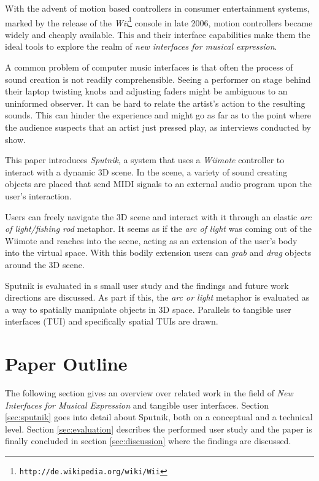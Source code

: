 \documentclass[10pt,a4paper]{scrartcl}
\begin{document}
With the advent of motion based controllers in consumer entertainment systems, marked by the release of the \emph{Wii}\footnote{\texttt{http://de.wikipedia.org/wiki/Wii}} console in late 2006, motion controllers became widely and cheaply available. This and their interface capabilities make them the ideal tools to explore the realm of \emph{new interfaces for musical expression}.


A common problem of computer music interfaces is that often the process of sound creation is not readily comprehensible. Seeing a performer on stage behind their laptop twisting knobs and adjusting faders might be ambiguous to an uninformed observer. It can be hard to relate the artist's action to the resulting sounds. This can hinder the experience and might go as far as to the point where the audience suspects that an artist just pressed play, as interviews conducted by \cite{Pedersen2009} show.

This paper introduces \emph{Sputnik}, a system that uses a \emph{Wiimote} controller to interact with a dynamic 3D scene. In the scene, a variety of sound creating objects are placed that send MIDI signals to an external audio program upon the user's interaction. 

Users can freely navigate the 3D scene and interact with it through an elastic \emph{arc of light/fishing rod} metaphor. It seems as if the \emph{arc of light} was coming out of the Wiimote and reaches into the scene, acting as an extension of the user's body into the virtual space. With this bodily extension users can \emph{grab} and \emph{drag} objects around the 3D scene.



Sputnik is evaluated in s small user study and the findings and future work directions are discussed. As part if this, the \emph{arc or light} metaphor is evaluated as a way to spatially manipulate objects in 3D space. Parallels to tangible user interfaces (TUI)\citep{Ishii1997} and specifically spatial TUIs\citep{Sharlin2004} are drawn. 


\section{Paper Outline}
The following section gives an overview over related work in the field of \emph{New Interfaces for Musical Expression} and tangible user interfaces. Section \ref{sec:sputnik} goes into detail about Sputnik, both on a conceptual and a technical level. Section \ref{sec:evaluation} describes the performed user study and the paper is finally concluded in section \ref{sec:discussion} where the findings are discussed.
\end{document}
